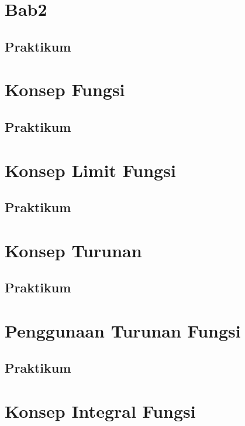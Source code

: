 \documentclass[
]{book}
\begin{document}
\chapter{Bab2}\label{bab2}

\section{Praktikum}\label{praktikum-1}

\chapter{Konsep Fungsi}\label{Konsep_Fungsi}

\section{Praktikum}\label{praktikum-2}

\chapter{Konsep Limit Fungsi}\label{Konsep_Limit_Fungsi}

\section{Praktikum}\label{praktikum-3}

\chapter{Konsep Turunan}\label{Konsep_Turunan}

\section{Praktikum}\label{praktikum-4}

\chapter{Penggunaan Turunan Fungsi}\label{Penggunaan_Turunan_Fungsi}

\section{Praktikum}\label{praktikum-5}

\chapter{Konsep Integral Fungsi}\label{Konsep_Integral_Fungsi}
\end{document}
